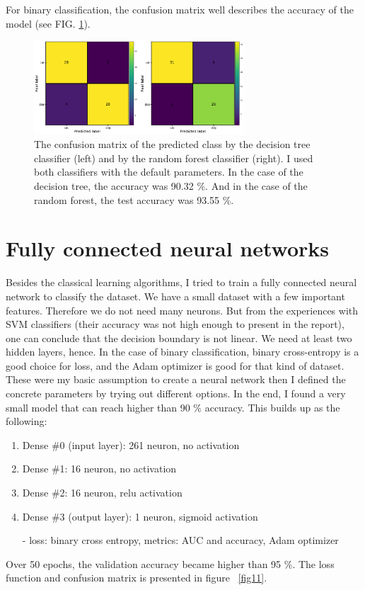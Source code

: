 \documentclass[12pt a4paper]{article}
\numberwithin{equation}{section}
\begin{document}
For binary classification, the confusion matrix well describes the accuracy of the model (see FIG.  \ref{fig10}).

\begin{figure}[H]
\centering
\includegraphics[width=0.7\textwidth]{fig/conf1.pdf}
\caption{The confusion matrix of the predicted class by the decision tree classifier (left) and by the random forest classifier (right). I used both classifiers with the default parameters.   In the case of the decision tree, the accuracy was 90.32 \%. And in the case of the random forest, the test accuracy was 93.55 \%.}
\label{fig10}
\end{figure}

\section{Fully connected neural networks}

Besides the classical learning algorithms, I tried to train a fully connected neural network to classify the dataset. We have a small dataset with a few important features. Therefore we do not need many neurons.  But from the experiences with SVM classifiers (their accuracy was not high enough to present in the report), one can conclude that the decision boundary is not linear.  We need at least two hidden layers, hence. In the case of binary classification, binary cross-entropy is a good choice for loss, and the Adam optimizer is good for that kind of dataset. These were my basic assumption to create a neural network then I defined the concrete parameters by trying out different options. In the end, I found a very small model that can reach higher than 90 \% accuracy.  This builds up as the following:
\begin{enumerate}
\item Dense \#0 (input layer): 261 neuron, no activation
\item Dense \#1: 16 neuron, no activation
\item Dense \#2: 16 neuron, relu activation
\item Dense \#3 (output layer): 1 neuron, sigmoid activation
\item[-]  loss: binary cross entropy, metrics: AUC and accuracy, Adam optimizer
\end{enumerate}
Over 50 epochs, the validation accuracy became higher than 95 \%. The loss function and confusion matrix is presented in figure ~\ref{fig11}.
\end{document}
